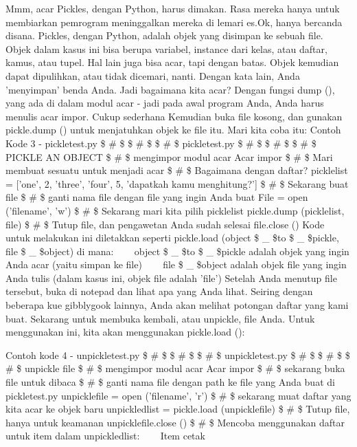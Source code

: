 Mmm, acar Pickles, dengan Python, harus dimakan. Rasa mereka hanya untuk membiarkan pemrogram meninggalkan mereka di lemari es.Ok, hanya bercanda disana. Pickles, dengan Python, adalah objek yang disimpan ke sebuah file. Objek dalam kasus ini bisa berupa variabel, instance dari kelas, atau daftar, kamus, atau tupel. Hal lain juga bisa acar, tapi dengan batas. Objek kemudian dapat dipulihkan, atau tidak dicemari, nanti. Dengan kata lain, Anda 'menyimpan' benda Anda. Jadi bagaimana kita acar? Dengan fungsi dump (), yang ada di dalam modul acar - jadi pada awal program Anda, Anda harus menulis acar impor. Cukup sederhana Kemudian buka file kosong, dan gunakan pickle.dump () untuk menjatuhkan objek ke file itu. Mari kita coba itu: 
Contoh Kode 3 - pickletest.py 
 \$  \#  \$ \$  \#  \$ \$  \#  \$ pickletest.py  
 \$  \#  \$ \$  \#  \$ \$  \#  \$ PICKLE AN OBJECT 
 \$  \#  \$ mengimpor modul acar  
Acar impor 
 \$  \#  \$ Mari membuat sesuatu untuk menjadi acar  
 \$  \#  \$ Bagaimana dengan daftar?  
picklelist = ['one', 2, 'three', 'four', 5, 'dapatkah kamu menghitung?'] 
 \$  \#  \$ Sekarang buat file  
 \$  \#  \$ ganti nama file dengan file yang ingin Anda buat 
File = open ('filename', 'w') 
 \$  \#  \$ Sekarang mari kita pilih picklelist 
pickle.dump (picklelist, file) 
 \$  \#  \$ Tutup file, dan pengawetan Anda sudah selesai  
file.close () 
Kode untuk melakukan ini diletakkan seperti pickle.load (object \$  \_  \$to \$  \_  \$pickle, file \$  \_  \$object) di mana: 
~~~ object \$  \_  \$to \$  \_  \$pickle adalah objek yang ingin Anda acar (yaitu simpan ke file)  
~~~ file \$  \_  \$object adalah objek file yang ingin Anda tulis (dalam kasus ini, objek file adalah 'file') 
Setelah Anda menutup file tersebut, buka di notepad dan lihat apa yang Anda lihat. Seiring dengan beberapa kue gibblygook lainnya, Anda akan melihat potongan daftar yang kami buat.  
Sekarang untuk membuka kembali, atau unpickle, file Anda. Untuk menggunakan ini, kita akan menggunakan pickle.load (): \par
Contoh kode 4 - unpickletest.py 
 \$  \#  \$ \$  \#  \$ \$  \#  \$ unpickletest.py 
 \$  \#  \$ \$  \#  \$ \$  \#  \$ unpickle file 
 \$  \#  \$ mengimpor modul acar 
Acar impor 
 \$  \#  \$ sekarang buka file untuk dibaca 
 \$  \#  \$ ganti nama file dengan path ke file yang Anda buat di pickletest.py 
unpicklefile = open ('filename', 'r') 
 \$  \#  \$ sekarang muat daftar yang kita acar ke objek baru 
unpickledlist = pickle.load (unpicklefile) 
 \$  \#  \$ Tutup file, hanya untuk keamanan  
unpicklefile.close () 
 \$  \#  \$ Mencoba menggunakan daftar
untuk item dalam unpickledlist: 
~~~ Item cetak 


